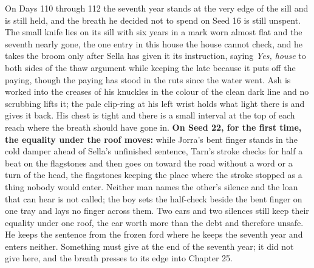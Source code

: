 \documentclass{design/chronicle}
\begin{document}
{On Days 110 through 112 the seventh year stands at the very edge of the sill and is still held, and the breath he decided not to spend on Seed 16 is still unspent. The small knife lies on its sill with six years in a mark worn almost flat and the seventh nearly gone, the one entry in this house the house cannot check, and he takes the broom only after Sella has given it its instruction, saying \emph{Yes, house} to both sides of the thaw argument while keeping the late because it puts off the paying, though the paying has stood in the ruts since the water went. Ash is worked into the creases of his knuckles in the colour of the clean dark line and no scrubbing lifts it; the pale clip-ring at his left wrist holds what light there is and gives it back. His chest is tight and there is a small interval at the top of each reach where the breath should have gone in. \textbf{On Seed 22, for the first time, the equality under the roof moves:} while Jorra’s bent finger stands in the cold damper ahead of Sella’s unfinished sentence, Tarn’s stroke checks for half a beat on the flagstones and then goes on toward the road without a word or a turn of the head, the flagstones keeping the place where the stroke stopped as a thing nobody would enter. Neither man names the other’s silence and the loan that can hear is not called; the boy sets the half-check beside the bent finger on one tray and lays no finger across them. Two ears and two silences still keep their equality under one roof, the ear worth more than the debt and therefore unsafe. He keeps the sentence from the frozen ford where he keeps the seventh year and enters neither. Something must give at the end of the seventh year; it did not give here, and the breath presses to its edge into Chapter 25.

}
\end{document}
